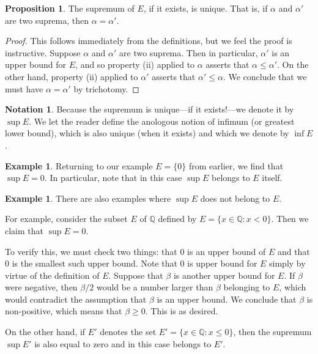 \documentclass[12pt]{article}
\theoremstyle{definition}
\newtheorem{example}[definition]{Example}
\newtheorem{notation}[definition]{Notation}
\theoremstyle{theorem}
\newtheorem{proposition}[definition]{Proposition}
\begin{document}
\begin{proposition}
The supremum of $E$, if it exists, is unique. That is, if $\alpha$ and $\alpha'$ are two suprema, then $\alpha = \alpha'$.
\end{proposition}

\begin{proof}
This follows immediately from the definitions, but we feel the proof is instructive. Suppose $\alpha$ and $\alpha'$ are two suprema. Then in particular, $\alpha'$ is an upper bound for $E$, and so property (ii) applied to $\alpha$ asserts that $\alpha \leqslant \alpha'$. On the other hand, property (ii) applied to $\alpha'$ asserts that $\alpha' \leqslant \alpha$. We conclude that we must have $\alpha = \alpha'$ by trichotomy. 
\end{proof}

\begin{notation}
Because the supremum is unique---if it exists!---we denote it by $\sup E$. We let the reader define the anologous notion of infimum (or greatest lower bound), which is also unique (when it exists) and which we denote by $\inf E$. 
\end{notation}

\begin{example}
Returning to our example $E = \{0\}$ from earlier, we find that $\sup E = 0$. In particular, note that in this case $\sup E$ belongs to $E$ itself.  
\end{example}

\begin{example}
There are also examples where $\sup E$ does not belong to $E$. 

For example, consider the subset $E$ of $\mathbb{Q}$ defined by $E = \{x \in \mathbb{Q} : x < 0\}$. Then we claim that $\sup E = 0$. 

To verify this, we must check two things: that $0$ is an upper bound of $E$ and that $0$ is the smallest such upper bound. Note that $0$ is upper bound for $E$ simply by virtue of the definition of $E$. Suppose that $\beta$ is another upper bound for $E$. If $\beta$ were negative, then $\beta/2$ would be a number larger than $\beta$ belonging to $E$, which would contradict the assumption that $\beta$ is an upper bound. We conclude that $\beta$ is non-positive, which means that $\beta \geqslant 0$. This is as desired. 

On the other hand, if $E'$ denotes the set $E' = \{x \in \mathbb{Q} : x \leqslant 0 \}$, then the supremum $\sup E'$ is also equal to zero and in this case belongs to $E'$. 
\end{example}
\end{document}
